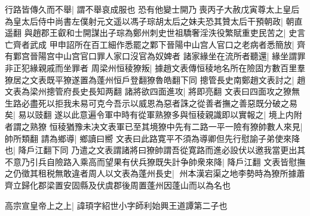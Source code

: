 行路皆傳久而不舉|{
	謂不舉哀成服也}
恐有他變士開乃喪丙子大赦戊寅尊太上皇后為皇太后侍中尚書左僕射元文遥以馮子琮胡太后之妹夫恐其贊太后干預朝政|{
	朝直遥翻}
與趙郡王叡和士開謀出子琮為鄭州刺史世祖驕奢淫泆役繁賦重吏民苦之|{
	史言亡齊者武成}
甲申詔所在百工細作悉罷之鄴下晉陽中山宫人官口之老病者悉簡放|{
	齊有鄴宫晉陽宫中山宫官口罪人家口沒官為奴婢者}
諸家緣坐在流所者聽還|{
	緣坐謂罪非正犯緣親戚而坐罪者}
周梁州恒稜獠叛|{
	據趙文表傳恒稜地名所在險固方數百里羣獠居之文表既平獠遂置為蓬州恒戶登翻獠魯皓翻下同}
摠管長史南鄭趙文表討之|{
	趙文表為梁州摠管府長史長知两翻}
諸將欲四面進攻|{
	將即亮翻}
文表曰四面攻之獠無生路必盡死以拒我未易可克今吾示以威恩為惡者誅之從善者撫之善惡既分破之易矣|{
	易以豉翻}
遂以此意遍令軍中時有從軍熟獠多與恒稜親識即以實報之|{
	境上内附者謂之熟獠}
恒稜猶豫未决文表軍已至其境獠中先有二路一平一險有獠帥數人來見|{
	帥所類翻}
請為鄉導|{
	鄉讀曰嚮}
文表曰此路寛平不須為導卿但先行慰諭子弟使來降也|{
	降戶江翻下同}
乃遣之文表謂諸將曰獠帥謂吾從寛路而進必設伏以邀我當更出其不意乃引兵自險路入乘高而望果有伏兵獠既失計争帥衆來降|{
	降戶江翻}
文表皆慰撫之仍徵其租税無敢違者周人以文表為蓬州長史|{
	州本漢宕渠之地李勢時為獠所據蕭齊立歸化郡梁置安固縣及伏虞郡後周置蓬州因蓬山而以為名也}


高宗宣皇帝上之上|{
	諱頊字紹世小字師利始興王道譚第二子也}


